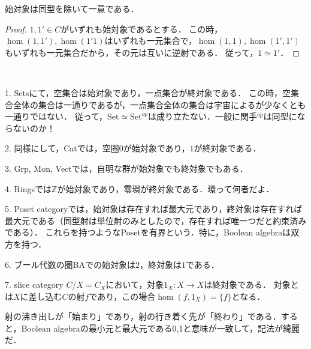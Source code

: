 \documentclass[uplatex, 12pt, dvipdfmx]{jsarticle}
\begin{document}
\begin{proposition}
    始対象は同型を除いて一意である．
\end{proposition}
\begin{proof}
    $1,1'\in C$がいずれも始対象であるとする．
    この時，$\hom(1,1'),\hom(1'1)$はいずれも一元集合で，$\hom(1,1),\hom(1',1')$もいずれも一元集合だから，その元は互いに逆射である．
    従って，$1\simeq 1'$．
\end{proof}

\begin{example}　

    1. Setsにて，空集合は始対象であり，一点集合が終対象である．
    この時，空集合全体の集合は一通りであるが，一点集合全体の集合は宇宙によるが少なくとも一通りではない．
    従って，$\mathrm{Set}\simeq\mathrm{Set}^{op}$は成り立たない．一般に関手${}^{op}$は同型にならないのか！

    2. 同様にして，Catでは，空圏$0$が始対象であり，$1$が終対象である．

    3. Grp, Mon, Vectでは，自明な群が始対象でも終対象でもある．

    4. Ringsでは$\mathbb{Z}$が始対象であり，零環が終対象である．環って何者だよ．

    5. Poset categoryでは，始対象は存在すれば最大元であり，終対象は存在すれば最大元である（同型射は単位射のみとしたので，存在すれば唯一つだと約束済みである）．
    これらを持つようなPosetを有界という．特に，Boolean algebraは双方を持つ．

    6. ブール代数の圏BAでの始対象は$2$，終対象は$1$である．

    7. slice category $C/X=C_X$において，対象$1_X:X\to X$は終対象である．
    対象とは$X$に差し込む$C$の射$f$であり，この場合$\hom(f,1_X)=\{f\}$となる．
    \begin{center}
    \end{center}
\end{example}
\begin{remark*}
    射の沸き出しが「始まり」であり，射の行き着く先が「終わり」である．すると，Boolean algebraの最小元と最大元である0,1と意味が一致して，記法が綺麗だ．
\end{remark*}
\end{document}
